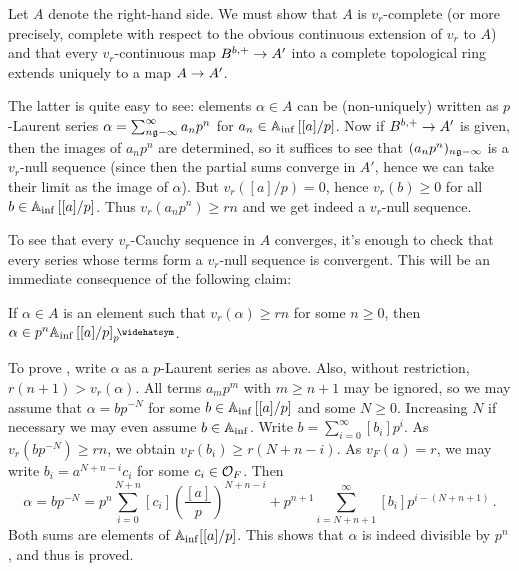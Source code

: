 \documentclass[a4paper, 10pt, oneside, DIV=9, chapterprefix=true, numbers=enddot,bibliography=totoc]{scrbook}
\begin{document}
\begin{proof*}
	Let $A$ denote the right-hand side. We must show that $A$ is $v_r$-complete (or more precisely, complete with respect to the obvious continuous extension of $v_r$ to $A$) and that every $v_r$-continuous map $B^{b,+}\morphism A'$ into a complete topological ring extends uniquely to a map $A\morphism A'$.
	
	The latter is quite easy to see: elements $\alpha\in A$ can be (non-uniquely) written as $p$-Laurent series $\alpha=\sum_{n\gge -\infty}^\infty a_np^n$ for $a_n\in \mathbb{A}_{\mathrm{inf}} \left[[a]/p\right]$. Now if $B^{b,+}\morphism A'$ is given, then the images of $a_np^n$ are determined, so it suffices to see that $(a_np^n)_{n\gge -\infty}$ is a $v_r$-null sequence (since then the partial sums converge in $A'$, hence we can take their limit as the image of $\alpha$). But $v_r([a]/p)=0$, hence $v_r(b)\geq 0$ for all $b\in \mathbb{A}_{\mathrm{inf}}\left[[a]/p\right]$. Thus $v_r(a_np^n)\geq rn$ and we get indeed a $v_r$-null sequence.
	
	To see that every $v_r$-Cauchy sequence in $A$ converges, it's enough to check that every series whose terms form a $v_r$-null sequence is convergent. This will be an immediate consequence of the following claim:
	\begin{alphanumerate}
		\item[\itememph{*}] If $\alpha\in A$ is an element such that $v_r(\alpha)\geq rn$ for some $n\geq 0$, then $\alpha\in p^n\IA_\inf\left[[a]/p\right]_p^\complete$.
	\end{alphanumerate}
	To prove \itememph{*}, write $\alpha$ as a $p$-Laurent series as above. Also, without restriction, $r(n+1)>v_r(\alpha)$. All terms $a_mp^m$ with $m\geq n+1$ may be ignored, so we may assume that $\alpha=bp^{-N}$ for some $b\in \mathbb{A}_{\mathrm{inf}}\left[[a]/p\right]$ and some $N\geq 0$. Increasing $N$ if necessary we may even assume $b\in \mathbb{A}_{\mathrm{inf}}$. Write $b=\sum_{i=0}^\infty[b_i]p^i$. As $v_r(bp^{-N})\geq rn$, we obtain $v_F(b_i)\geq r(N+n-i)$. As $v_F(a)=r$, we may write $b_i=a^{N+n-i}c_i$ for some $c_i\in \mathcal{O}_F$. Then
	\begin{equation*}
		\alpha=bp^{-N}=p^n\sum_{i=0}^{N+n}[c_i]\left(\frac{[a]}{p}\right)^{N+n-i}+p^{n+1}\sum_{i=N+n+1}^\infty[b_i]p^{i-(N+n+1)}\,.
	\end{equation*}
	Both sums are elements of $\mathbb{A}_{\mathrm{inf}}[[a]/p]$. This shows that $\alpha$ is indeed divisible by $p^n$, and thus \itememph{*} is proved.
\end{proof*}
\end{document}

